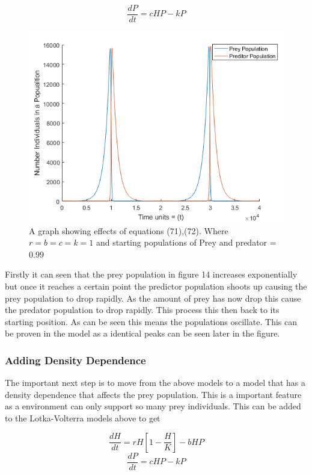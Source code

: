 \documentclass[final]{cmpreport}
\begin{document}
	\begin{equation} 
	\frac{dP}{dt}=cHP-kP
	\end{equation} 
	
	\begin{figure}[h!] 
				\includegraphics[width=\textwidth]{PredPreyModel.png} 
				\caption{A graph showing effects of equations (71),(72). Where 
					$r=b=c=k=1$ and starting populations of Prey and predator = $0.99$
					} 
	\end{figure}
	
	Firstly it can seen that the prey population in figure 14 increases exponentially but once it reaches a certain point the predictor population shoots up causing the prey population to drop rapidly. As the amount of prey has now drop this cause the predator population to drop rapidly. This process this then back to its starting position. As can be seen this means the populations oscillate. This can be proven in the model as a identical peaks can be seen later in the figure.
	
	
	\subsubsection{Adding Density Dependence}
	The important next step is to move from the above models to a model that has a density dependence that affects the prey population. This is a important feature as a environment can only support so many prey individuals. This can be added to the Lotka-Volterra models above to get
	

	\begin{equation}  \frac{dH}{dt}=rH[1-\frac{H}{K}]-bHP	\end{equation} 
	\begin{equation} \frac{dP}{dt}=cHP-kP \end{equation} 
	
\end{document}
